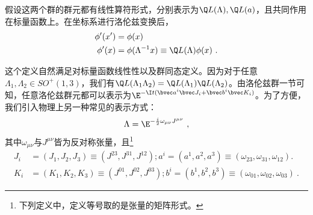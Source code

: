 假设这两个群的群元都有线性算符形式，分别表示为$\Q L(\Lambda),\Q L(a)$，且共同作用在标量函数上。在坐标系进行洛伦兹变换后，
\begin{equation}\label{eq_PoinGr_1}
\begin{aligned}
\phi'(x')&=\phi(x)\\
\phi'(x)&=\phi(\Lambda^{-1}x)\equiv \Q L(\Lambda)\phi(x)~.
\end{aligned}
\end{equation}

这个定义自然满足对标量函数线性性以及群同态定义。因为对于任意$\Lambda_1,\Lambda_2\in SO^+(1,3)$，我们有$\Q L(\Lambda_1\Lambda_2)=\Q L(\Lambda_1)\Q L(\Lambda_2)$。由洛伦兹群一节可知，任意洛伦兹群元都可以表示为$\E^{-\I t(\bvec a^i\bvec J_i+\bvec b^i\bvec K_i)}$。为了方便，我们引入物理上另一种常见的表示方式：
\begin{equation}
\Lambda=\E^{-\frac{i}{2} \omega_{\mu \nu} J^{\mu \nu}}
~,
\end{equation}
其中$\omega_{\mu\nu}$与$J^{\mu\nu}$皆为反对称张量，且\footnote{下列定义中，定义等号取的是张量的矩阵形式。}
\begin{equation}\label{eq_PoinGr_2}
\begin{aligned}
J_i&=(J_1,J_2,J_3)\equiv(J^{23},J^{31},J^{12});a^i=(a^1,a^2,a^3)\equiv(\omega_{23},\omega_{31},\omega_{12}).\\
K_i&=(K_1,K_2,K_3)\equiv(J^{01},J^{02},J^{03});b^i=(b^1,b^2,b^3)\equiv(\omega_{01},\omega_{02},\omega_{03})~.
\end{aligned}
\end{equation}


